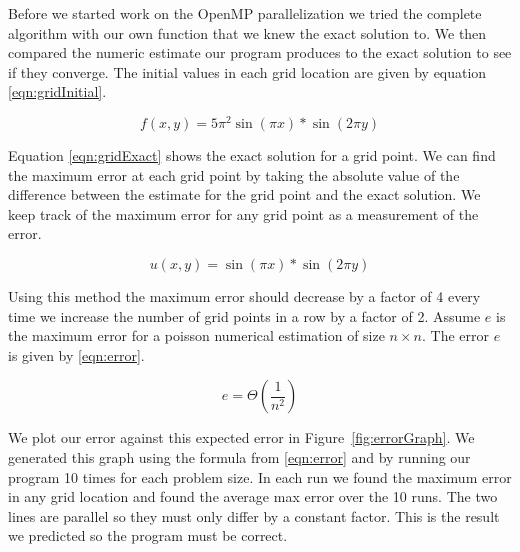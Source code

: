 \documentclass{article}
\begin{document}
	Before we started work on the OpenMP parallelization we tried the complete algorithm with our own function that we knew the exact solution to. We then compared the numeric estimate our program produces to the exact solution to see if they converge. The initial values in each grid location are given by equation \ref{eqn:gridInitial}.

	\begin{equation}
		\label{eqn:gridInitial}
		f(x,y) = 5\pi^2 \sin(\pi x)* \sin(2\pi y)
	\end{equation}

	Equation \ref{eqn:gridExact} shows the exact solution for a grid point. We can find the maximum error at each grid point by taking the absolute value of the difference between the estimate for the grid point and the exact solution. We keep track of the maximum error for any grid point as a measurement of the error.

	\begin{equation}
		\label{eqn:gridExact}
		u(x,y) = \sin(\pi x) * \sin(2 \pi y)
	\end{equation}

	Using this method the maximum error should decrease by a factor of 4 every time we increase the number of grid points in a row by a factor of 2. Assume $e$ is the maximum error for a poisson numerical estimation of size $n \times n$. The error $e$ is given by \ref{eqn:error}.

	\begin{equation}
		\label{eqn:error}
		e = \Theta(\frac{1}{n^2})
	\end{equation}

	We plot our error against this expected error in Figure~\ref{fig:errorGraph}. We generated this graph using the formula from \ref{eqn:error} and by running our program 10 times for each problem size. In each run we found the maximum error in any grid location and found the average max error over the 10 runs. The two lines are parallel so they must only differ by a constant factor. This is the result we predicted so the program must be correct.
\end{document}
